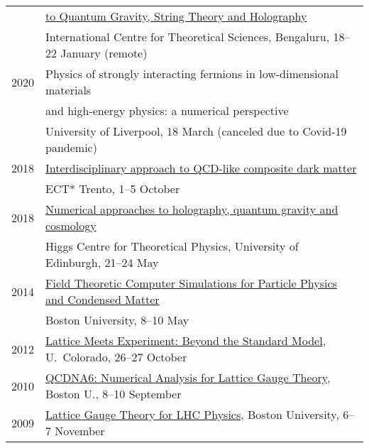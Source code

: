 \documentclass[10 pt]{article}
\begin{document}
\begin{tabular}[t]{cl}
       & \hfill \href{https://www.icts.res.in/program/numstrings2021}{to Quantum Gravity, String Theory and Holography}                                                              \\
       & International Centre for Theoretical Sciences, Bengaluru, 18--22 January (remote)                                                                                           \\[6 pt]
  2020 & Physics of strongly interacting fermions in low-dimensional materials                                                                                                       \\
       & \hfill and high-energy physics: a numerical perspective                                                                                                                     \\
       & University of Liverpool, 18 March (canceled due to Covid-19 pandemic)                                                                                                       \\[6 pt]
  2018 & \href{https://www.ectstar.eu/workshops/interdisciplinary-approach-to-qcd-like-composite-dark-matter/}{Interdisciplinary approach to QCD-like composite dark matter}         \\
       & ECT* Trento, 1--5 October                                                                                                                                                   \\[6 pt]
  2018 & \href{https://higgs.ph.ed.ac.uk/workshops/numerical-approaches-holography-quantum-gravity-and-cosmology}{Numerical approaches to holography, quantum gravity and cosmology} \\
       & Higgs Centre for Theoretical Physics, University of Edinburgh, 21--24 May                                                                                                   \\[6 pt]
  2014 & \href{http://blogs.bu.edu/ppcm/}{Field Theoretic Computer Simulations for Particle Physics and Condensed Matter}                                                            \\
       & Boston University, 8--10 May                                                                                                                                                \\[6 pt]
  2012 & \href{http://www.maths.liv.ac.uk/TheorPhys/people/staff/schaich/lat-exp-2012/}{Lattice Meets Experiment: Beyond the Standard Model}, U.~Colorado, 26--27 October            \\[6 pt]
  2010 & \href{http://www.maths.liv.ac.uk/TheorPhys/people/staff/schaich/QCDNA6/}{QCDNA6: Numerical Analysis for Lattice Gauge Theory}, Boston U., 8--10 September                   \\[6 pt]
  2009 & \href{http://www.maths.liv.ac.uk/TheorPhys/people/staff/schaich/LGTforLHC2009/}{Lattice Gauge Theory for LHC Physics}, Boston University, 6--7 November                     \\
\end{tabular}
\end{document}
